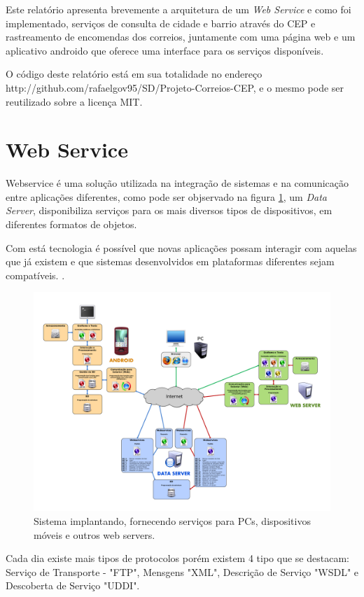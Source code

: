 \documentclass[journal]{IEEEtran}
\begin{document}
Este relatório apresenta brevemente a arquitetura de um \textit{Web Service} e como foi implementado, serviços de consulta de cidade e barrio através do CEP e rastreamento de encomendas dos correios, juntamente com uma página web e um aplicativo androido que oferece uma interface para os serviços disponíveis.

O código deste relatório está em sua totalidade no endereço http://github.com/rafaelgov95/SD/Projeto-Correios-CEP, e o mesmo pode ser reutilizado sobre a licença MIT.
\section{Web Service}
Webservice é uma solução utilizada na integração de sistemas e na comunicação entre aplicações diferentes, como pode ser objservado na figura \ref{wbs}, um \textit{Data Server}, disponibiliza serviços para os mais diversos tipos de dispositivos, em diferentes formatos de objetos.

Com está tecnologia é possível que novas aplicações possam interagir com aquelas que já existem e que sistemas desenvolvidos em plataformas diferentes sejam compatíveis. 
\cite{webservece}.
\begin{figure}[H]
	\centering
	\includegraphics[scale=0.14]{Imagens/webservice.png}
	\caption{Sistema implantando, fornecendo serviços para PCs, dispositivos móveis e outros web servers.}
	\label{wbs}
\end{figure} 

Cada dia existe mais tipos de protocolos porém existem 4 tipo que se destacam: Serviço de Transporte - "FTP", Mensgens "XML", Descrição de Serviço "WSDL"  e Descoberta de Serviço "UDDI".
\end{document}
